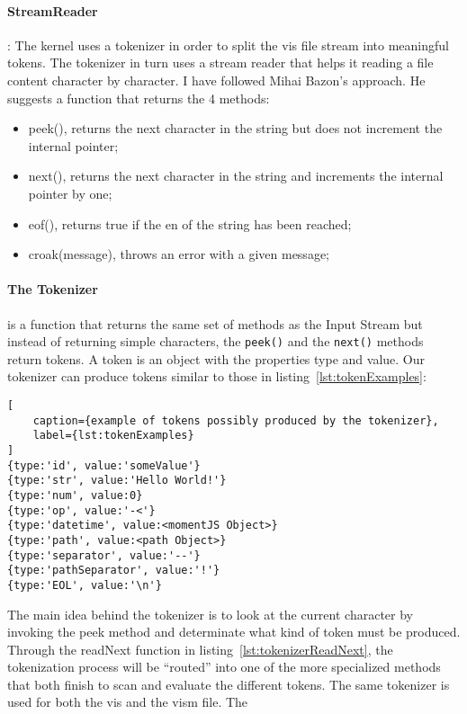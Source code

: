 \paragraph{StreamReader}: The kernel uses a tokenizer in order to split the vis file stream into meaningful tokens. The tokenizer in turn uses a stream reader that helps it reading a file content character by character. I have followed Mihai Bazon's approach\cite{bazon16}. He suggests a function that returns the 4 methods:

\begin{itemize}
    \item peek(), returns the next character in the string but does not increment the internal pointer;
    \item next(), returns the next character in the string and increments the internal pointer by one;
    \item eof(), returns true if the en of the string has been reached;
    \item croak(message), throws an error with a given message;
\end{itemize}

\paragraph{The Tokenizer} is a function that returns the same set of methods as the Input Stream but instead of returning simple characters, the \texttt{peek()} and the \texttt{next()} methods return tokens. A token is an object with the properties type and value. Our tokenizer can produce tokens similar to those in listing~\ref{lst:tokenExamples}:

\begin{lstlisting}[
    caption={example of tokens possibly produced by the tokenizer},
    label={lst:tokenExamples}
]
{type:'id', value:'someValue'}
{type:'str', value:'Hello World!'}
{type:'num', value:0}
{type:'op', value:'-<'}
{type:'datetime', value:<momentJS Object>}
{type:'path', value:<path Object>}
{type:'separator', value:'--'}
{type:'pathSeparator', value:'!'}
{type:'EOL', value:'\n'}
\end{lstlisting}

The main idea behind the tokenizer is to look at the current character by invoking the peek method and determinate what kind of token must be produced. Through the readNext function in listing~\ref{lst:tokenizerReadNext}, the tokenization process will be ``routed'' into one of the more specialized methods that both finish to scan and evaluate the different tokens. The same tokenizer is used for both the vis and the vism file. The 

